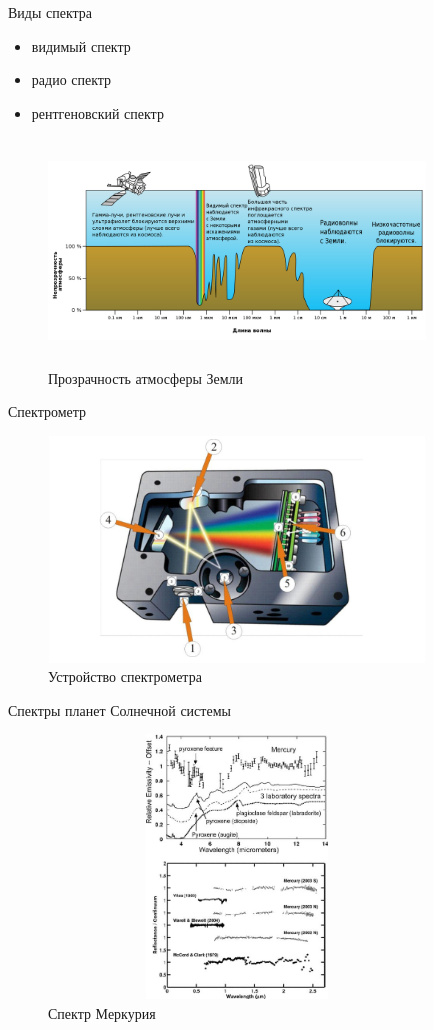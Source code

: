 \documentclass[
]{beamer}
\begin{document}
	\begin{frame}{Виды спектра}
		\begin{itemize}
			\item видимый спектр
			\item радио спектр
			\item рентгеновский спектр
		\end{itemize}
		\begin{figure}[H]
			\centering
			\includegraphics[width=10cm, height=6cm]{прозрачность.png}
			\caption{Прозрачность атмосферы Земли}
		\end{figure}
	\end{frame}
	
	
	\begin{frame}{Спектрометр}
	\begin{figure}[H]
		\centering
		\includegraphics[width=10cm, height=6cm]{спектрометр.png}
		\caption{Устройство спектрометра}
	\end{figure}
	\end{frame}
	
	\begin{frame}{Спектры планет Солнечной системы}
		\begin{figure}[H]
			\centering
			\includegraphics[width=10cm, height=7cm]{меркуриий_спектр.png}
			\caption{Спектр Меркурия}
		\end{figure}
	\end{frame}
\end{document}
